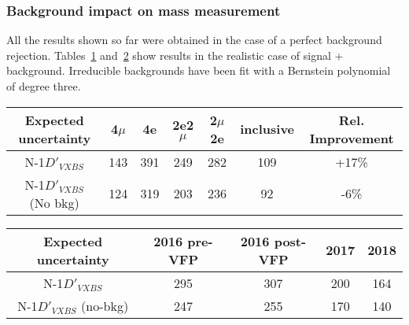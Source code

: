 \subsubsection{Background impact on mass measurement}
All the results shown so far were obtained in the case of a perfect background rejection. 
Tables~\ref{table:bkg_impact} and~\ref{table:bkg_impact_year} show results in the 
realistic case of signal + background. 
Irreducible backgrounds have been fit with a Bernstein polynomial of degree three.
\begin{table}[ht]	
\begin{center}
	\begin{tabular}{ccccccc}
		\hline			
	Expected uncertainty	&	4$\mu$	&	4e	&	2e2$\mu$	&2$\mu$2e	& inclusive	&	Rel. Improvement \\
		\hline			
		N-1$D'_{VXBS}$	&	143	&	391	&	249	&	282	&	109	&	+17\%	\\
		N-1$D'_{VXBS}$ (No bkg)	&	124	&	319	&	203	&	236	&	92	&	-6\%	\\
		\hline
	\end{tabular}
	\label{table:bkg_impact}
\end{center}
\end{table}
\begin{table}[ht]	
\begin{center}
	\begin{tabular}{ccccc}
	\hline			
	Expected uncertainty	&	2016 pre-VFP	&	2016 post-VFP	&	2017	&	2018	\\
	\hline		
		N-1$D'_{VXBS}$	&	295	&	307	&	200	&	164	\\
		N-1$D'_{VXBS}$ (no-bkg)	&	247	&	255	&	170	&	140	\\
	\hline
	\end{tabular}
	\label{table:bkg_impact_year}
\end{center}
\end{table}
